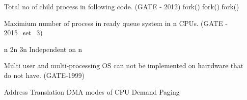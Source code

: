 \vspace{0.08in}

\begin{minipage}{\linewidth}

  \question  Total no of child process in following code. (GATE - 2012) \newline
    fork()  \newline fork()  \newline  fork()

  \begin{oneparchoices}
  \end{oneparchoices}

\end{minipage}

\vspace{0.08in}


\begin{minipage}{\linewidth}

  \question Maximium number of process in ready queue system in n CPUs. (GATE - 2015\_set\_3)

  \begin{oneparchoices}
    \choice n
    \choice 2n
    \choice 3n
    \choice Independent on n
  \end{oneparchoices}

\end{minipage}

\vspace{0.08in}



\begin{minipage}{\linewidth}

  \question  Multi user and multi-processing OS can not be implemented on harrdware that do not have. (GATE-1999)

  \begin{oneparchoices}
    \choice Address Translation
    \choice DMA
     modes of CPU
    \choice Demand Paging
  \end{oneparchoices}

\end{minipage}

\vspace{0.08in}


